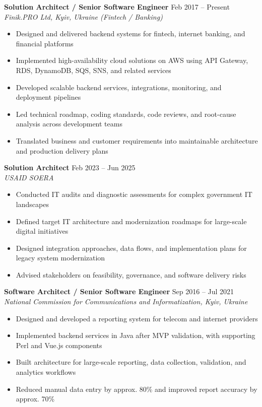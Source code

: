 \documentclass[10pt,a4paper]{article}
\begin{document}
\textbf{Solution Architect / Senior Software Engineer} \hfill Feb 2017 -- Present \\
\textit{Finik.PRO Ltd, Kyiv, Ukraine (Fintech / Banking)}

\begin{itemize}
\item Designed and delivered backend systems for fintech, internet banking, and financial platforms
\item Implemented high-availability cloud solutions on AWS using API Gateway, RDS, DynamoDB, SQS, SNS, and related services
\item Developed scalable backend services, integrations, monitoring, and deployment pipelines
\item Led technical roadmap, coding standards, code reviews, and root-cause analysis across development teams
\item Translated business and customer requirements into maintainable architecture and production delivery plans
\end{itemize}

\textbf{Solution Architect} \hfill Feb 2023 -- Jun 2025 \\
\textit{USAID SOERA}

\begin{itemize}
\item Conducted IT audits and diagnostic assessments for complex government IT landscapes
\item Defined target IT architecture and modernization roadmaps for large-scale digital initiatives
\item Designed integration approaches, data flows, and implementation plans for legacy system modernization
\item Advised stakeholders on feasibility, governance, and software delivery risks
\end{itemize}

\textbf{Software Architect / Senior Software Engineer} \hfill Sep 2016 -- Jul 2021 \\
\textit{National Commission for Communications and Informatization, Kyiv, Ukraine}

\begin{itemize}
\item Designed and developed a reporting system for telecom and internet providers
\item Implemented backend services in Java after MVP validation, with supporting Perl and Vue.js components
\item Built architecture for large-scale reporting, data collection, validation, and analytics workflows
\item Reduced manual data entry by approx. 80\% and improved report accuracy by approx. 70\%
\end{itemize}
\end{document}
